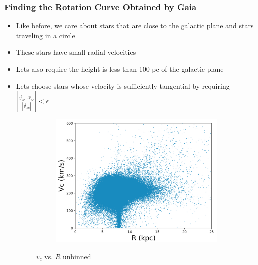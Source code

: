 \documentclass{beamer}
\begin{document}
\begin{frame}
\frametitle{Finding the Rotation Curve Obtained by Gaia}
\begin{itemize}
\item Like before, we care about stars that are close to the galactic plane and stars traveling in a circle
\item These stars have small radial velocities 
\item Lets also require the height is less than 100 pc of the galactic plane
\item Lets choose stars whose velocity is sufficiently tangential by requiring 
$|\frac{\vec{v}_{sc} \cdot \hat{r}_{sc}}{|\vec{v}_{sc}|}|< \epsilon$

\begin{figure}[h!]
  \centering
  \begin{subfigure}[b]{0.5\linewidth}
    \includegraphics[width=\linewidth]{rotCurvBefBin3}
  \end{subfigure}
    \caption{$v_c$ vs. $R$ unbinned}
\end{figure}

\end{itemize}
\end{frame}
\end{document}
